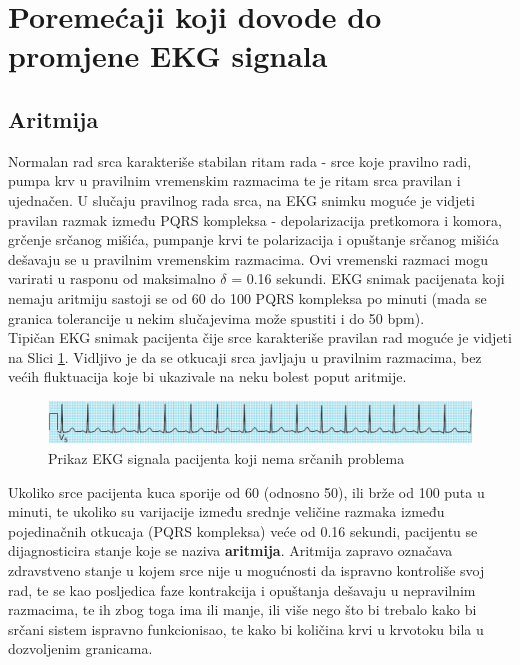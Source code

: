 \documentclass[12pt,a4paper]{article}
\begin{document}
\newpage

\section{Poremećaji koji dovode do promjene EKG signala}

\subsection{Aritmija}

\quad Normalan rad srca karakteriše stabilan ritam rada - srce koje pravilno radi, pumpa krv u pravilnim vremenskim razmacima te je ritam srca pravilan i ujednačen. U slučaju pravilnog rada srca, na EKG snimku moguće je vidjeti pravilan razmak između PQRS kompleksa - depolarizacija pretkomora i komora, grčenje srčanog mišića, pumpanje krvi te polarizacija i opuštanje srčanog mišića dešavaju se u pravilnim vremenskim razmacima. Ovi vremenski razmaci mogu varirati u rasponu od maksimalno $\delta$ = 0.16 sekundi. EKG snimak pacijenata koji nemaju aritmiju sastoji se od 60 do 100 PQRS kompleksa po minuti (mada se granica tolerancije u nekim slučajevima može spustiti i do 50 bpm). \cite{arrhythmia-book} \\

Tipičan EKG snimak pacijenta čije srce karakteriše pravilan rad moguće je vidjeti na Slici \ref{s1}. Vidljivo je da se otkucaji srca javljaju u pravilnim razmacima, bez većih fluktuacija koje bi ukazivale na neku bolest poput aritmije.

\begin{figure}[H]
\center
\includegraphics[scale=0.7]{../res/s1.PNG}
\caption{Prikaz EKG signala pacijenta koji nema srčanih problema}
\label{s1}
\end{figure}

Ukoliko srce pacijenta kuca sporije od 60 (odnosno 50), ili brže od 100 puta u minuti, te ukoliko su varijacije između srednje veličine razmaka između pojedinačnih otkucaja (PQRS kompleksa) veće od 0.16 sekundi, pacijentu se dijagnosticira stanje koje se naziva \textbf{aritmija}. Aritmija zapravo označava zdravstveno stanje u kojem srce nije u mogućnosti da ispravno kontroliše svoj rad, te se kao posljedica faze kontrakcija i opuštanja dešavaju u nepravilnim razmacima, te ih zbog toga ima ili manje, ili više nego što bi trebalo kako bi srčani sistem ispravno funkcionisao, te kako bi količina krvi u krvotoku bila u dozvoljenim granicama. \cite{arrhythmia-basics} \\ 
\end{document}
